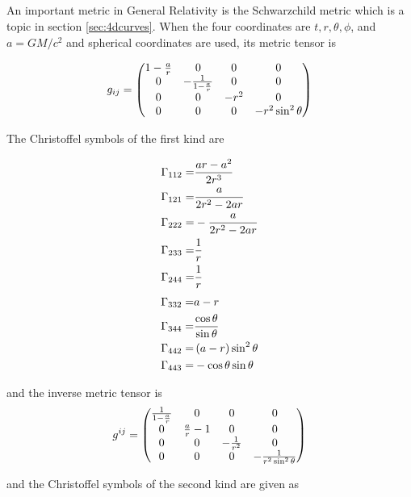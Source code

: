 {\subsection{}
\label{sec:schwarz}
An important metric in General Relativity is the Schwarzchild metric which is a topic in 
section \ref{sec:4dcurves}. When the four coordinates are $t, r, \theta, \phi$, and 
 $a=GM/c^2$ and spherical coordinates are used, its metric tensor is

$$
g_{ij}= 
\begin{pmatrix}
1-{{a}\over{r}}&0&0&0\cr 
0&-{{1}\over{1-{{a}\over{r}}}}&0& 0\cr 
0&0&-r^2&0\cr 0&0&0&-r^2\sin ^2\theta\cr 
\end{pmatrix}
$$

The Christoffel symbols of the first kind are

\begin{twocol}{
\begin{eqnarray*}
\Gamma_{112}=&{{ar-a^2}\over{2r^3}}\\
\Gamma_{121}=&{{a}\over{2r^2-2ar}}\\
\Gamma_{222}=&-{{a}\over{2r^2-2ar}}\\
\Gamma_{233}=&{{1}\over{r}}\\
\Gamma_{244}=&{{1}\over{r}}\\
\end{eqnarray*}
}{
\begin{eqnarray*}
\Gamma_{332}=&a-r\\
\Gamma_{344}=&{{\cos \theta}\over{\sin \theta}}\\
\Gamma_{442}=&\left(a-r\right)\sin ^2\theta\\
\Gamma_{443}=&-\cos \theta\sin \theta\\
\end{eqnarray*}
}
\end{twocol}

and the inverse metric tensor is 
$$
g^{ij} = 
\begin{pmatrix}
{{1}\over{1-{{a}\over{r}}}}&0&0&0\cr 0&{{a}\over{r}}-1&0&0
 \cr 0&0&-{{1}\over{r^2}}&0\cr 0&0&0&-{{1}\over{r^2\sin ^2\theta
 }}\cr 
\end{pmatrix}
$$

and the Christoffel symbols of the second kind are given as 

}
